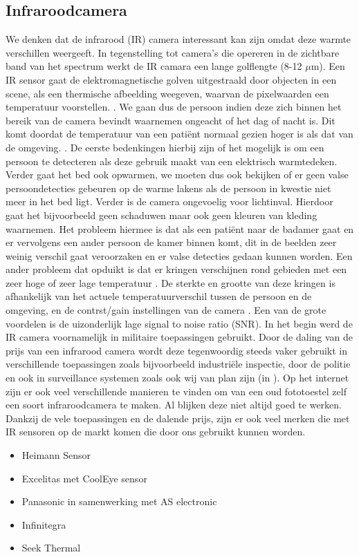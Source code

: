 \subsection{Infraroodcamera}
\label{refIRC}
We denken dat de infrarood (IR) camera interessant kan zijn omdat deze warmte verschillen weergeeft. In tegenstelling tot camera's die opereren in de zichtbare band van het spectrum werkt de IR camara  een lange golflengte (8-12 $\mu$m). Een IR sensor gaat de elektromagnetische golven uitgestraald door objecten in een scene, als een thermische afbeelding weegeven, waarvan de pixelwaarden een temperatuur voorstellen. \cite{bibIRC2}. We gaan dus de persoon indien deze zich binnen het bereik van de camera bevindt waarnemen ongeacht of het dag of nacht is. Dit komt doordat de temperatuur van een pati\"ent normaal gezien hoger is als dat van de omgeving. \cite{bibIRC3}.
De eerste bedenkingen hierbij zijn of het mogelijk is om een persoon te detecteren als deze gebruik maakt van een elektrisch warmtedeken. Verder gaat het bed ook opwarmen, we moeten dus ook bekijken of er geen valse persoondetecties gebeuren op de warme lakens als de persoon in kwestie niet meer in het bed ligt. Verder is de camera ongevoelig voor lichtinval. Hierdoor gaat het bijvoorbeeld geen schaduwen maar ook geen kleuren van kleding waarnemen. Het probleem hiermee is dat als een pati\"ent naar de badamer gaat en er vervolgens een ander persoon de kamer binnen komt, dit in de beelden zeer weinig verschil gaat veroorzaken en er valse detecties gedaan kunnen worden.  Een ander probleem dat opduikt is dat er kringen verschijnen rond gebieden met een zeer hoge of zeer lage temperatuur \cite{bibIRC4}. De sterkte en grootte van deze kringen is afhankelijk van het actuele temperatuurverschil tussen de persoon en de omgeving, en de contrst/gain instellingen van de camera \cite{bibBET6}. Een van de grote voordelen is de uizonderlijk lage signal to noise ratio (SNR). In het begin werd de IR camera voornamelijk in militaire toepassingen gebruikt. Door de daling van de prijs van een infrarood camera wordt deze tegenwoordig steeds vaker gebruikt in verschillende toepassingen zoals bijvoorbeeld industri\"ele inspectie, door de politie en ook in surveillance systemen zoals ook wij van plan zijn (in \cite{bibBET6}). Op het internet zijn er ook veel verschillende manieren te vinden om van een oud fototoestel zelf een soort infraroodcamera te maken. Al blijken deze niet altijd goed te werken.
Dankzij de vele toepassingen en de dalende prijs, zijn er ook veel merken die met IR sensoren op de markt komen die door ons gebruikt kunnen worden.
\begin{itemize}
	\item Heimann Sensor
	\item Excelitas met CoolEye sensor
	\item Panasonic in samenwerking met AS electronic
	\item Infinitegra
	\item Seek Thermal
\end{itemize}

